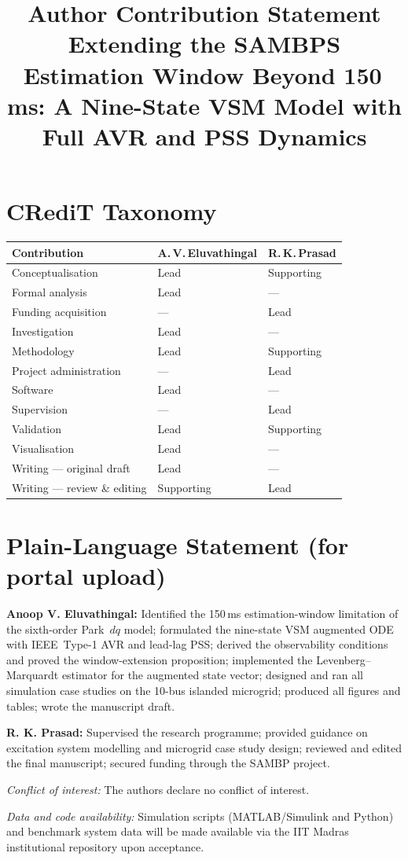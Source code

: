 \documentclass[11pt,a4paper]{article}
\title{\textbf{Author Contribution Statement}\\[4pt]
       \large Extending the SAMBPS Estimation Window Beyond 150\,ms:
       A Nine-State VSM Model with Full AVR and PSS Dynamics}
\author{}
\date{}
\begin{document}
\maketitle\thispagestyle{empty}

\section*{CRediT Taxonomy}

\noindent
\begin{tabular}{@{}p{5.8cm} p{3.0cm} p{3.0cm}@{}}
\toprule
\textbf{Contribution} & \textbf{A.\,V.\,Eluvathingal} & \textbf{R.\,K.\,Prasad} \\
\midrule
Conceptualisation          & Lead   & Supporting \\
Formal analysis            & Lead   & ---        \\
Funding acquisition        & ---    & Lead       \\
Investigation              & Lead   & ---        \\
Methodology                & Lead   & Supporting \\
Project administration     & ---    & Lead       \\
Software                   & Lead   & ---        \\
Supervision                & ---    & Lead       \\
Validation                 & Lead   & Supporting \\
Visualisation              & Lead   & ---        \\
Writing --- original draft & Lead   & ---        \\
Writing --- review \& editing & Supporting & Lead \\
\bottomrule
\end{tabular}

\bigskip

\section*{Plain-Language Statement (for portal upload)}

\textbf{Anoop V. Eluvathingal:} Identified the 150\,ms estimation-window
limitation of the sixth-order Park~$dq$ model; formulated the nine-state
VSM augmented ODE with IEEE~Type-1 AVR and lead-lag PSS; derived the
observability conditions and proved the window-extension proposition;
implemented the Levenberg--Marquardt estimator for the augmented state
vector; designed and ran all simulation case studies on the 10-bus
islanded microgrid; produced all figures and tables; wrote the manuscript
draft.

\textbf{R. K. Prasad:} Supervised the research programme; provided
guidance on excitation system modelling and microgrid case study design;
reviewed and edited the final manuscript; secured funding through the
SAMBP project.

\bigskip
\noindent\textit{Conflict of interest:} The authors declare no conflict
of interest.

\bigskip
\noindent\textit{Data and code availability:} Simulation scripts
(MATLAB/Simulink and Python) and benchmark system data will be made
available via the IIT Madras institutional repository upon acceptance.
\end{document}
